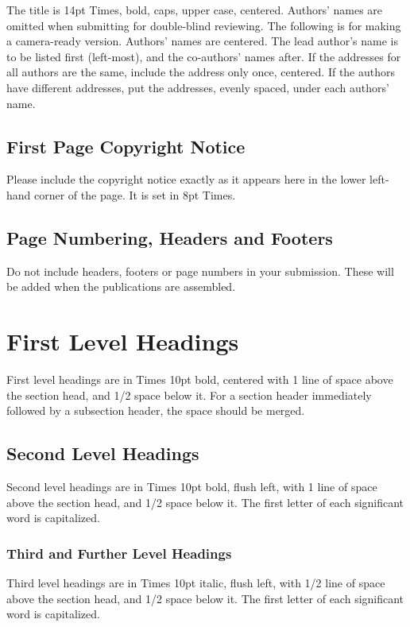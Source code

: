 \documentclass{article}
\begin{document}
The title is 14pt Times, bold, caps, upper case, centered.
Authors' names are omitted when submitting for double-blind reviewing. 
The following is for making a camera-ready version. 
Authors' names are centered. 
The lead author's name is to be listed first (left-most), and the co-authors' names after. 
If the addresses for all authors are the same, include the address only once, centered. 
If the authors have different addresses, put the addresses, evenly spaced, under each authors' name.

\subsection{First Page Copyright Notice}

Please include the copyright notice exactly as it appears here in the lower left-hand corner of the page. 
It is set in 8pt Times.

\subsection{Page Numbering, Headers and Footers}

Do not include headers, footers or page numbers in your submission. 
These will be added when the publications are assembled.

\section{First Level Headings}

First level headings are in Times 10pt bold, 
centered with 1 line of space above the section head, and 1/2 space below it. 
For a section header immediately followed by a subsection header, the space should be merged.

\subsection{Second Level Headings}

Second level headings are in Times 10pt bold, flush left, 
with 1 line of space above the section head, and 1/2 space below it. 
The first letter of each significant word is capitalized.

\subsubsection{Third and Further Level Headings}

Third level headings are in Times 10pt italic, flush left, 
with 1/2 line of space above the section head, and 1/2 space below it. 
The first letter of each significant word is capitalized.
\end{document}
